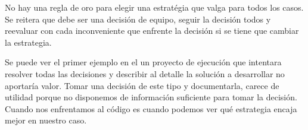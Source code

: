 No hay una regla de oro para elegir una estratégia que valga para todos los casos. Se reitera que debe ser una decisión de equipo, seguir la decisión todos y reevaluar con cada inconveniente que enfrente la decisión si se tiene que cambiar la estrategia.

Se puede ver el primer ejemplo en el un proyecto de ejecución que intentara resolver todas las decisiones y describir al detalle la solución a desarrollar no aportaría valor. Tomar una decisión de este tipo y documentarla, carece de utilidad porque no disponemos de información suficiente para tomar la decisión. Cuando nos enfrentamos al código es cuando podemos ver qué estrategia encaja mejor en nuestro caso.